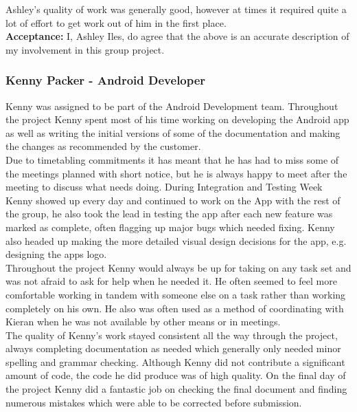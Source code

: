 \documentclass{article}
\begin{document}
		Ashley's quality of work was generally good, however at times it required quite a lot of effort to get work out of him in the first place. \\
		
{\bf Acceptance:} I, Ashley Iles, do agree that the above is an accurate description of my involvement in this group project.


		\subsubsection{Kenny Packer - Android Developer}

		Kenny was assigned to be part of the Android Development team. Throughout the project Kenny spent most of his time working on developing the Android app as well as writing the initial versions of some of the documentation and making the changes as recommended by the customer. \\
		
		Due to timetabling commitments it has meant that he has had to miss some of the meetings planned with short notice, but he is always happy to meet after the meeting to discuss what needs doing. During Integration and Testing Week Kenny showed up every day and continued to work on the App with the rest of the group, he also took the lead in testing the app after each new feature was marked as complete, often flagging up major bugs which needed fixing. Kenny also headed up making the more detailed visual design decisions for the app, e.g. designing the apps logo. \\
		
		Throughout the project Kenny would always be up for taking on any task set and was not afraid to ask for help when he needed it. He often seemed to feel more comfortable working in tandem with someone else on a task rather than working completely on his own. He also was often used as a method of coordinating with Kieran when he was not available by other means or in meetings. \\
		
		The quality of Kenny's work stayed consistent all the way through the project, always completing documentation as needed which generally only needed minor spelling and grammar checking. Although Kenny did not contribute a significant amount of code, the code he did produce was of high quality. On the final day of the project Kenny did a fantastic job on checking the final document and finding numerous mistakes which were able to be corrected before submission. \\
		
\end{document}
